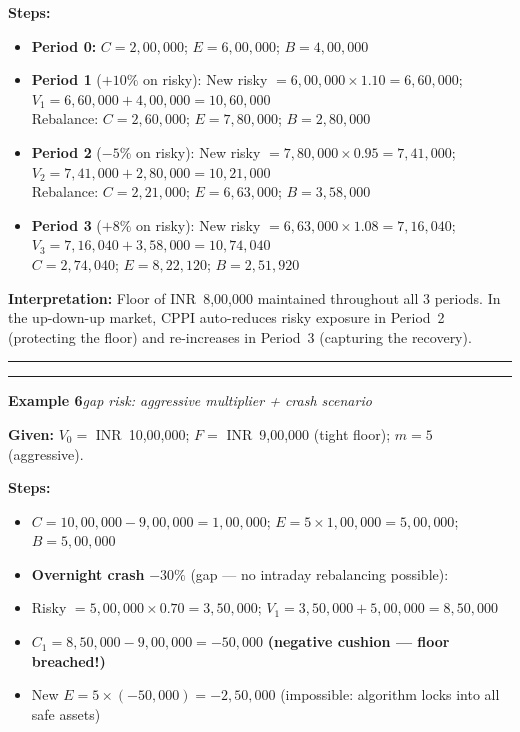 \documentclass[
]{article}
\begin{document}
\noindent\textbf{Steps:}
\begin{itemize}\setlength{\itemsep}{3pt}
  \item \textbf{Period 0:} $C=2{,}00{,}000$; $E=6{,}00{,}000$; $B=4{,}00{,}000$
  \item \textbf{Period 1} ($+10\%$ on risky): New risky $=6{,}00{,}000\times1.10=6{,}60{,}000$; $V_1=6{,}60{,}000+4{,}00{,}000=10{,}60{,}000$\\
        Rebalance: $C=2{,}60{,}000$; $E=7{,}80{,}000$; $B=2{,}80{,}000$ \checkmark
  \item \textbf{Period 2} ($-5\%$ on risky): New risky $=7{,}80{,}000\times0.95=7{,}41{,}000$; $V_2=7{,}41{,}000+2{,}80{,}000=10{,}21{,}000$\\
        Rebalance: $C=2{,}21{,}000$; $E=6{,}63{,}000$; $B=3{,}58{,}000$ \checkmark
  \item \textbf{Period 3} ($+8\%$ on risky): New risky $=6{,}63{,}000\times1.08=7{,}16{,}040$; $V_3=7{,}16{,}040+3{,}58{,}000=10{,}74{,}040$\\
        $C=2{,}74{,}040$; $E=8{,}22{,}120$; $B=2{,}51{,}920$ \checkmark
\end{itemize}

\noindent\textbf{Interpretation:} Floor of INR~8{,}00{,}000 maintained throughout all 3 periods. In the up-down-up market, CPPI auto-reduces risky exposure in Period~2 (protecting the floor) and re-increases in Period~3 (capturing the recovery).

\noindent\rule{\linewidth}{0.4pt}
\medskip
\noindent\rule{\linewidth}{0.4pt}
\noindent\textbf{Example 6}\enspace\textit{gap risk: aggressive multiplier + crash scenario}

\noindent\textbf{Given:} $V_0=$ INR~10{,}00{,}000; $F=$ INR~9{,}00{,}000 (tight floor); $m=5$ (aggressive).

\noindent\textbf{Steps:}
\begin{itemize}\setlength{\itemsep}{3pt}
  \item $C=10{,}00{,}000-9{,}00{,}000=1{,}00{,}000$; $E=5\times1{,}00{,}000=5{,}00{,}000$; $B=5{,}00{,}000$
  \item \textbf{Overnight crash} $-30\%$ (gap --- no intraday rebalancing possible):
  \item Risky $=5{,}00{,}000\times0.70=3{,}50{,}000$; $V_1=3{,}50{,}000+5{,}00{,}000=8{,}50{,}000$
  \item $C_1=8{,}50{,}000-9{,}00{,}000=-50{,}000$ \textbf{(negative cushion --- floor breached!)}
  \item New $E=5\times(-50{,}000)=-2{,}50{,}000$ (impossible: algorithm locks into all safe assets)
\end{itemize}
\end{document}
